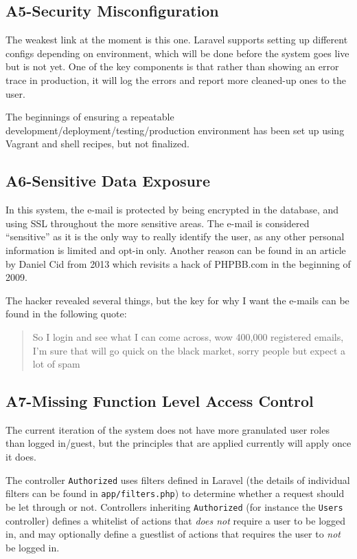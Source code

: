\subsection{A5-Security Misconfiguration}
\noindent
The weakest link at the moment is this one. Laravel supports setting up different configs depending on environment, which will be done before the system goes live but is not yet. One of the key components is that
rather than showing an error trace in production, it will log the errors and report more cleaned-up ones to the user.

The beginnings of ensuring a repeatable development/deployment/testing/production environment has been set up using Vagrant and shell recipes, but not finalized.

\subsection{A6-Sensitive Data Exposure}
\noindent
In this system, the e-mail is protected by being encrypted in the database, and using SSL throughout the more sensitive areas. The e-mail is considered ``sensitive'' as it is the only way to really identify the user, as any other personal information is limited and opt-in only. Another reason can be found in an article by Daniel Cid \citep{Sucuri2013} from 2013 which revisits a hack of PHPBB.com in the beginning of 2009.

The hacker revealed several things, but the key for why I want the e-mails can be found in the following quote:
\begin{quote}
So I login and see what I can come across, wow 400,000 registered emails, I’m sure that will go quick on the black market, sorry people but expect a lot of spam
\end{quote}

\subsection{A7-Missing Function Level Access Control}
\noindent
The current iteration of the system does not have more granulated user roles than logged in/guest, but the principles that are applied currently will apply once it does.

The controller \texttt{Authorized} uses filters defined in Laravel (the details of individual filters can be found in \texttt{app/filters.php}) to determine whether a request should be let through or not. Controllers inheriting \texttt{Authorized} (for instance the \texttt{Users} controller) defines a whitelist of actions that \emph{does not} require a user to be logged in, and may optionally define a guestlist of actions that requires the user to \emph{not} be logged in.

